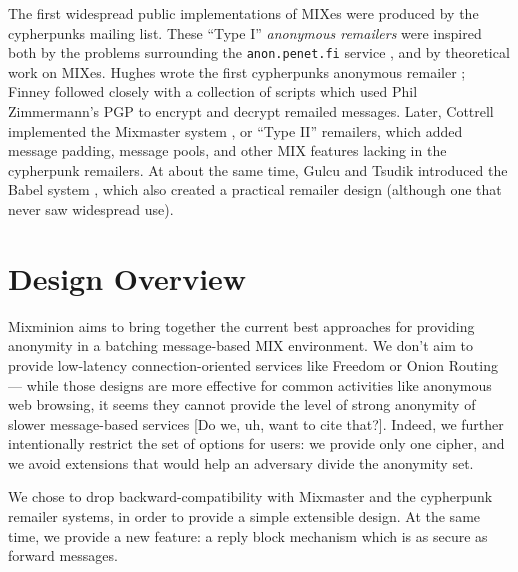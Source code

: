 \documentclass{llncs}
\begin{document}
The first widespread public implementations of MIXes were produced by the
cypherpunks mailing list. These ``Type I'' \emph{anonymous remailers}
were inspired both by the problems surrounding the {\tt anon.penet.fi}
service \cite{helsingius}, and by theoretical work on MIXes. Hughes wrote
the first cypherpunks anonymous remailer \cite{remailer-history}; Finney
followed closely with a collection of scripts which used Phil Zimmermann's
PGP to encrypt and decrypt remailed messages. Later, Cottrell implemented
the Mixmaster system \cite{mixmaster}, or ``Type II'' remailers, which
added message padding, message pools, and other MIX features lacking
in the cypherpunk remailers. At about the same time, Gulcu and Tsudik
introduced the Babel system \cite{babel}, which also created a practical
remailer design (although one that never saw widespread use).






\section{Design Overview}
\label{sec:design}

Mixminion aims to bring together the current best approaches for providing
anonymity in a batching message-based MIX environment. We don't aim
to provide low-latency connection-oriented services like Freedom
\cite{freedom} or Onion Routing \cite{onion-routing} --- while those
designs are more effective for common activities like anonymous web
browsing, it seems they cannot provide the level of strong anonymity of
slower message-based services [Do we, uh, want to cite that?]. Indeed, we
further intentionally restrict the set of options for users: we provide
only one cipher, and we avoid extensions that would help an adversary
divide the anonymity set.

We chose to drop backward-compatibility with Mixmaster and the cypherpunk
remailer systems, in order to provide a simple extensible design. At
the same time, we provide a new feature: a reply block mechanism which
is as secure as forward messages.
\end{document}
